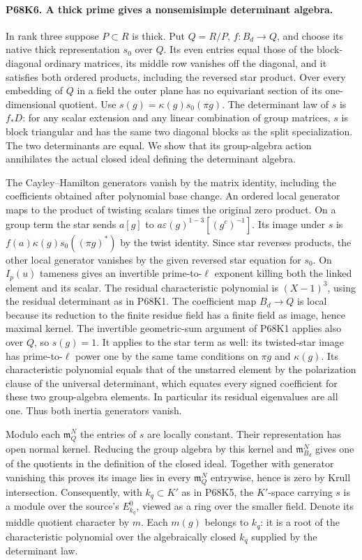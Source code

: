 \paragraph{P68K6. A thick prime gives a nonsemisimple determinant algebra.}
In rank three suppose $P\subset R$ is thick. Put $Q=R/P$,
$f:B_d\to Q$, and choose its native thick representation $s_0$
over $Q$. Its even entries equal those of the block-diagonal
ordinary matrices, its middle row vanishes off the diagonal,
and it satisfies both ordered products, including the reversed
star product. Over every embedding of $Q$ in a field the outer
plane has no equivariant section of its one-dimensional quotient.
Use $s(g)=\kappa(g)s_0(\pi g)$. The determinant law of $s$
is $f_*D$: for any scalar extension and any linear combination
of group matrices, $s$ is block triangular and has the same
two diagonal blocks as the split specialization. The two
determinants are equal. We show that its group-algebra action
annihilates the actual closed ideal defining the determinant
algebra.

The Cayley--Hamilton generators vanish by the matrix identity,
including the coefficients obtained after polynomial base change.
An ordered local generator maps to the product of twisting
scalars times the original zero product. On a group term the
star sends $a[g]$ to
$a\varepsilon(g)^{1-3}[(g^c)^{-1}]$. Its image under $s$ is
$f(a)\kappa(g)s_0((\pi g)^*)$ by the twist identity. Since star
reverses products, the other local generator vanishes by the
given reversed star equation for $s_0$. On $I_p(u)$ tameness
gives an invertible prime-to-$\ell$ exponent killing both the
linked element and its scalar. The residual characteristic
polynomial is $(X-1)^3$, using the residual determinant as in
P68K1. The coefficient map $B_d\to Q$ is local because its
reduction to the finite residue field has a finite field as image,
hence maximal kernel. The invertible geometric-sum argument of
P68K1 applies also over $Q$, so $s(g)=1$. It applies to the
star term as well: its twisted-star image has prime-to-$\ell$
power one by the same tame conditions on $\pi g$ and $\kappa(g)$.
Its characteristic polynomial equals that of the unstarred
element by the polarization clause of the universal determinant,
which equates every signed coefficient for these two group-algebra
elements. In particular its residual eigenvalues are all one. Thus both inertia generators vanish.

Modulo each $\mathfrak m_Q^N$ the entries of $s$ are locally
constant. Their representation has open normal kernel. Reducing
the group algebra by this kernel and $\mathfrak m_{B_d}^N$ gives
one of the quotients in the definition of the closed ideal.
Together with generator vanishing this proves its image lies in
every $\mathfrak m_Q^N$ entrywise, hence is zero by Krull
intersection. Consequently, with $k_q\subset K'$ as in P68K5,
the $K'$-space carrying $s$ is a module over the source's
$E^0_{k_q}$, viewed as a ring over the smaller field. Denote
its middle quotient character by $m$. Each $m(g)$ belongs to
$k_q$: it is a root of the characteristic polynomial over the
algebraically closed $k_q$ supplied by the determinant law.

